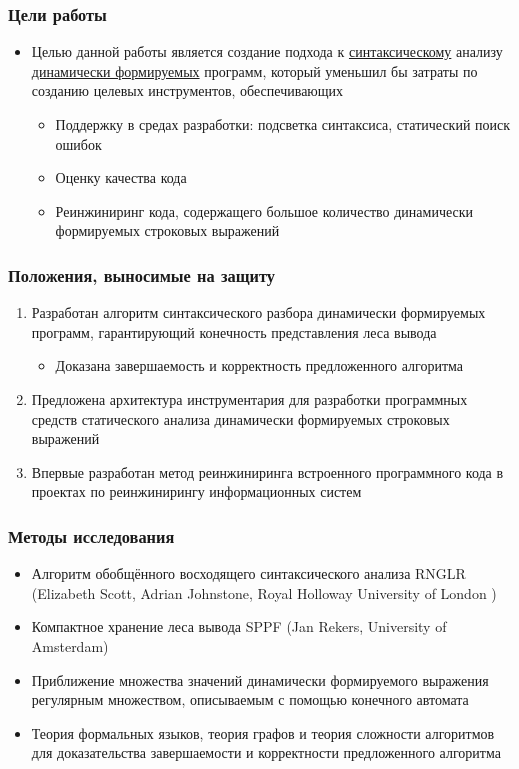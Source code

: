 \documentclass{beamer}
\begin{document}
\begin{frame}
    \transwipe[direction=90]
    \frametitle{Цели работы}
    \begin{itemize}
        \item Целью данной работы является создание подхода к \underline{синтаксическому} анализу \underline{динамически формируемых} программ, 
        который уменьшил бы затраты по созданию целевых инструментов, обеспечивающих
        \begin{itemize}
            \item Поддержку в средах разработки: подсветка синтаксиса, статический поиск ошибок
            \item Оценку качества кода
            \item Реинжиниринг кода, содержащего большое количество динамически формируемых строковых 
        выражений
        \end{itemize}
    \end{itemize}
\end{frame}

\begin{frame}
    \transwipe[direction=90]
    \frametitle{Положения, выносимые на защиту}
    \begin{enumerate}
        \item Разработан алгоритм синтаксического разбора динамически формируемых программ, гарантирующий конечность представления леса вывода
        \begin{itemize}
            \item Доказана завершаемость и корректность предложенного алгоритма
        \end{itemize}
        \item Предложена архитектура инструментария для разработки программных средств статического анализа динамически формируемых строковых выражений
        \item Впервые разработан метод реинжиниринга встроенного программного кода в проектах по реинжинирингу информационных систем
    \end{enumerate}
\end{frame}

\begin{frame}
    \transwipe[direction=90]
    \frametitle{Методы исследования}
        \begin{itemize}
            \item Алгоритм обобщённого восходящего синтаксического анализа RNGLR (Elizabeth Scott, Adrian Johnstone, Royal Holloway University of London )
            \item Компактное хранение леса вывода SPPF (Jan Rekers, University of Amsterdam)
            \item Приближение множества значений динамически формируемого выражения регулярным множеством, описываемым с помощью конечного автомата
            \item Теория формальных языков, теория графов и теория сложности алгоритмов для доказательства завершаемости и корректности предложенного алгоритма            
        \end{itemize}
\end{frame}
\end{document}
